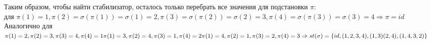 \documentclass[a4paper, 12pt]{article}
\begin{document}
	Таким образом, чтобы найти стабилизатор, осталось только перебрать все значения для подстановки $\pi$: \\
	для $\pi(1) = 1, \pi(2) = \sigma(\pi(1)) = \sigma(1) = 2, \pi(3) = \sigma(\pi(2)) = \sigma(2) = 3, \pi(4) = \sigma(\pi(3)) = \sigma(3) = 4 \Rightarrow \pi = id$ \\
	Аналогично для $\pi(1) = 2, \pi(2) = 3, \pi(3) = 4, \pi(4) = 1 \\
	\pi(1) = 3, \pi(2) = 4, \pi(3) = 1, \pi(4) = 2 \\
	\pi(1) = 4, \pi(2) = 1, \pi(3) = 2, \pi(4) = 3 \Rightarrow \\
	st(\sigma) = \{id, (1, 2, 3, 4), (1, 3)(2, 4), (1, 4, 3, 2)\}$
	
	
\end{document}
